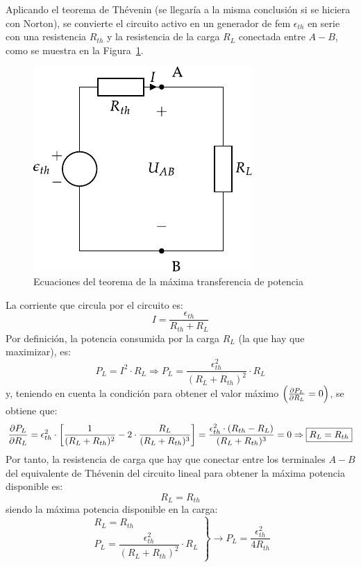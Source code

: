 Aplicando el teorema de Thévenin (se llegaría a la misma conclusión si se hiciera con Norton), se convierte el circuito activo en un generador de fem $\epsilon_{th}$ en serie con una resistencia ${R_{th}}$ y la resistencia de la carga ${R_L}$ conectada entre $A-B$, como se muestra en la Figura~\ref{fig.equivalenteThevenin0_cc}. 
\begin{figure}[H]
    \centering
    \includegraphics{../figs/thevenin_continua.pdf}
    \caption{Ecuaciones del teorema de la máxima transferencia de potencia}
    \label{fig.equivalenteThevenin0_cc}
\end{figure}

La corriente que circula por el circuito es: 
\begin{equation*}
{I} = \frac{{\epsilon}_{th}}{R_{th} + {R}_L}
\end{equation*}
Por definición, la potencia consumida por la carga $R_L$ (la que hay que maximizar), es: 
\begin{equation*}
   P_L= I^2 \cdot R_L\Rightarrow P_L = \dfrac{\epsilon_{th}^2}{(R_L+R_{th})^2} \cdot R_L
\end{equation*}
y, teniendo en cuenta la condición para obtener el valor máximo $\left(\diffp{P_L}{R_L} = 0\right)$, se obtiene que:
    \begin{equation*}%
        \diffp{P_L}{R_L} = \epsilon^2_{th} \cdot \left[\frac{1}{(R_L + R_{th})^2} - 2 \cdot \frac{R_L}{(R_L + R_{th})^3}\right]= \frac{\epsilon^2_{th} \cdot (R_{th} - R_L)}{(R_L + R_{th})^3}=0\Rightarrow \boxed{R_L = R_{th}}
    \end{equation*}
Por tanto, la resistencia de carga que hay que conectar entre los terminales $A-B$ del equivalente de Thévenin del circuito lineal para obtener la máxima potencia disponible es:
\begin{equation}
    \boxed{R_L = R_{th}}
\end{equation}
siendo la máxima potencia disponible en la carga:
\begin{equation}
  \left.
    \begin{matrix}
      R_L = R_{th}\\
      P_L = \dfrac{\epsilon_{th}^2}{{(R_L+R_{th})^2}} \cdot R_L
    \end{matrix} \right\}\rightarrow
  \boxed{P_L = \frac{\epsilon^2_{th}}{4 R_{th}}}
\end{equation}


